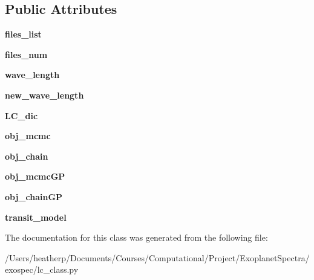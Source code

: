 \subsection*{Public Attributes}
\begin{DoxyCompactItemize}
\item 
\mbox{\label{classexospec_1_1lc__class_1_1_light_curve_aad67f4c50ac516b103faff7218d395b4}} 
{\bfseries files\+\_\+list}
\item 
\mbox{\label{classexospec_1_1lc__class_1_1_light_curve_a94e87b80871595e9ee15d29ef8bc1c15}} 
{\bfseries files\+\_\+num}
\item 
\mbox{\label{classexospec_1_1lc__class_1_1_light_curve_a818e9f5b159a68a971d7a7aaaac3cfb2}} 
{\bfseries wave\+\_\+length}
\item 
\mbox{\label{classexospec_1_1lc__class_1_1_light_curve_a86b7eae27d3c15065a096e1eb25a48f0}} 
{\bfseries new\+\_\+wave\+\_\+length}
\item 
\mbox{\label{classexospec_1_1lc__class_1_1_light_curve_a2bc92de5f90658957da35f6bf3050b7a}} 
{\bfseries L\+C\+\_\+dic}
\item 
\mbox{\label{classexospec_1_1lc__class_1_1_light_curve_a02d9a3945664f48a03963beae70fc7b8}} 
{\bfseries obj\+\_\+mcmc}
\item 
\mbox{\label{classexospec_1_1lc__class_1_1_light_curve_a22f6adbcc1c7e2cd6833846908eb1b9c}} 
{\bfseries obj\+\_\+chain}
\item 
\mbox{\label{classexospec_1_1lc__class_1_1_light_curve_adf7758c000691cd491b4b428ad627fa1}} 
{\bfseries obj\+\_\+mcmc\+GP}
\item 
\mbox{\label{classexospec_1_1lc__class_1_1_light_curve_ac00c2dab94929ffbf53f3de9c66e1d8a}} 
{\bfseries obj\+\_\+chain\+GP}
\item 
\mbox{\label{classexospec_1_1lc__class_1_1_light_curve_a02b2f724874285b53d4e788cb9b4e05d}} 
{\bfseries transit\+\_\+model}
\end{DoxyCompactItemize}


The documentation for this class was generated from the following file\+:\begin{DoxyCompactItemize}
\item 
/\+Users/heatherp/\+Documents/\+Courses/\+Computational/\+Project/\+Exoplanet\+Spectra/exospec/lc\+\_\+class.\+py\end{DoxyCompactItemize}
